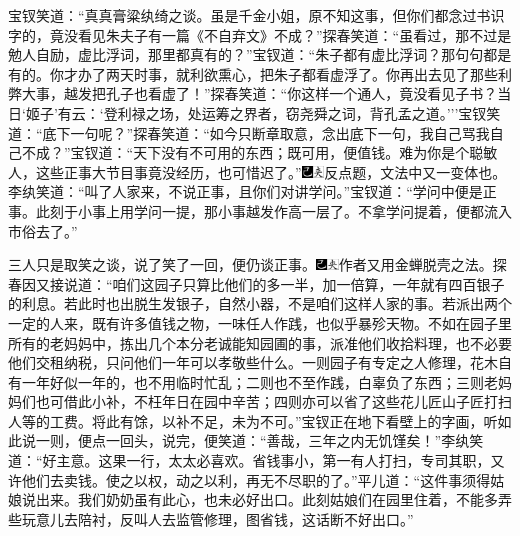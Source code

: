 宝钗笑道：``真真膏粱纨绮之谈。虽是千金小姐，原不知这事，但你们都念过书识字的，竟没看见朱夫子有一篇《不自弃文》不成？''探春笑道：``虽看过，那不过是勉人自励，虚比浮词，那里都真有的？''宝钗道：``朱子都有虚比浮词？那句句都是有的。你才办了两天时事，就利欲熏心，把朱子都看虚浮了。你再出去见了那些利弊大事，越发把孔子也看虚了！''探春笑道：``你这样一个通人，竟没看见子书？当日`姬子'有云：`登利禄之场，处运筹之界者，窃尧舜之词，背孔孟之道。'''宝钗笑道：``底下一句呢？''探春笑道：``如今只断章取意，念出底下一句，我自己骂我自己不成？''宝钗道：``天下没有不可用的东西；既可用，便值钱。难为你是个聪敏人，这些正事大节目事竟没经历，也可惜迟了。''{\includegraphics[width=3mm]{../Images/00003}\includegraphics[width=3mm]{../Images/00012}\footnotesize \kaishu 反点题，文法中又一变体也。}李纨笑道：``叫了人家来，不说正事，且你们对讲学问。''宝钗道：``学问中便是正事。此刻于小事上用学问一提，那小事越发作高一层了。不拿学问提着，便都流入市俗去了。''

三人只是取笑之谈，说了笑了一回，便仍谈正事。{\includegraphics[width=3mm]{../Images/00003}\includegraphics[width=3mm]{../Images/00012}\footnotesize \kaishu 作者又用金蝉脱壳之法。}探春因又接说道：``咱们这园子只算比他们的多一半，加一倍算，一年就有四百银子的利息。若此时也出脱生发银子，自然小器，不是咱们这样人家的事。若派出两个一定的人来，既有许多值钱之物，一味任人作践，也似乎暴殄天物。不如在园子里所有的老妈妈中，拣出几个本分老诚能知园圃的事，派准他们收拾料理，也不必要他们交租纳税，只问他们一年可以孝敬些什么。一则园子有专定之人修理，花木自有一年好似一年的，也不用临时忙乱；二则也不至作践，白辜负了东西；三则老妈妈们也可借此小补，不枉年日在园中辛苦；四则亦可以省了这些花儿匠山子匠打扫人等的工费。将此有馀，以补不足，未为不可。''宝钗正在地下看壁上的字画，听如此说一则，便点一回头，说完，便笑道：``善哉，三年之内无饥馑矣！''李纨笑道：``好主意。这果一行，太太必喜欢。省钱事小，第一有人打扫，专司其职，又许他们去卖钱。使之以权，动之以利，再无不尽职的了。''平儿道：``这件事须得姑娘说出来。我们奶奶虽有此心，也未必好出口。此刻姑娘们在园里住着，不能多弄些玩意儿去陪衬，反叫人去监管修理，图省钱，这话断不好出口。''

